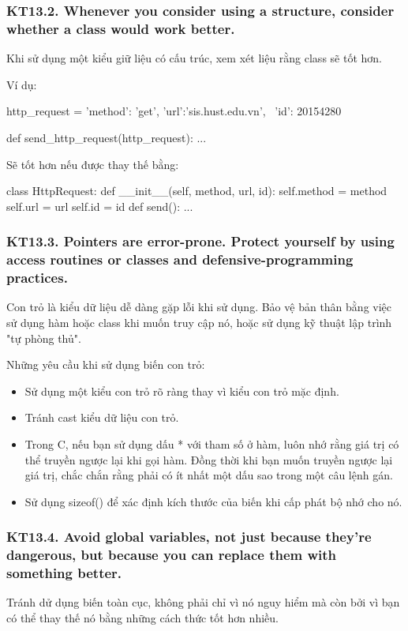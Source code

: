 \documentclass[12pt]{report}
\begin{document}
\subsubsection{KT13.2. Whenever you consider using a structure, consider whether a class would work better.}
Khi sử dụng một kiểu giữ liệu có cấu trúc, xem xét liệu rằng class sẽ tốt hơn.

Ví dụ:
\begin{python}
http_request = {'method': 'get', 'url':'sis.hust.edu.vn', \
						'id': 20154280}

def send_http_request(http_request):
	...
\end{python}
Sẽ tốt hơn nếu được thay thế bằng:
\begin{python}
class HttpRequest:
	def __init__(self, method, url, id):
		self.method = method
		self.url = url
		self.id = id
	def send():
		...
\end{python}

 
\subsubsection{KT13.3. Pointers are error-prone. Protect yourself by using access routines or classes and defensive-programming practices.}
Con trỏ là kiểu dữ liệu dễ dàng gặp lỗi khi sử dụng. Bảo vệ bản thân bằng việc sử dụng hàm hoặc class khi muốn truy cập nó, hoặc sử dụng kỹ thuật lập trình "tự phòng thủ".
\vspace*{5mm}

\noindent Những yêu cầu khi sử dụng biến con trỏ:
\begin{itemize}
	\item Sử dụng một kiểu con trỏ rõ ràng thay vì kiểu con trỏ mặc định. 
	\item Tránh cast kiểu dữ liệu con trỏ.
	\item Trong C, nếu bạn sử dụng dấu * với tham số ở hàm, luôn nhớ rằng giá trị có thể truyền ngược lại khi gọi hàm. Đồng thời khi bạn muốn truyền ngược lại giá trị, chắc chắn rằng phải có ít nhất một dấu sao trong một câu lệnh gán. 
	\item Sử dụng sizeof() để xác định kích thước của biến khi cấp phát bộ nhớ cho nó. 
\end{itemize}

\subsubsection{KT13.4. Avoid global variables, not just because they're dangerous, but because you can replace them with something better.}
Tránh dử dụng biến toàn cục, không phải chỉ vì nó nguy hiểm mà còn bởi vì bạn có thể thay thế nó bằng những cách thức tốt hơn nhiều. 
\vspace*{5mm}
\end{document}
